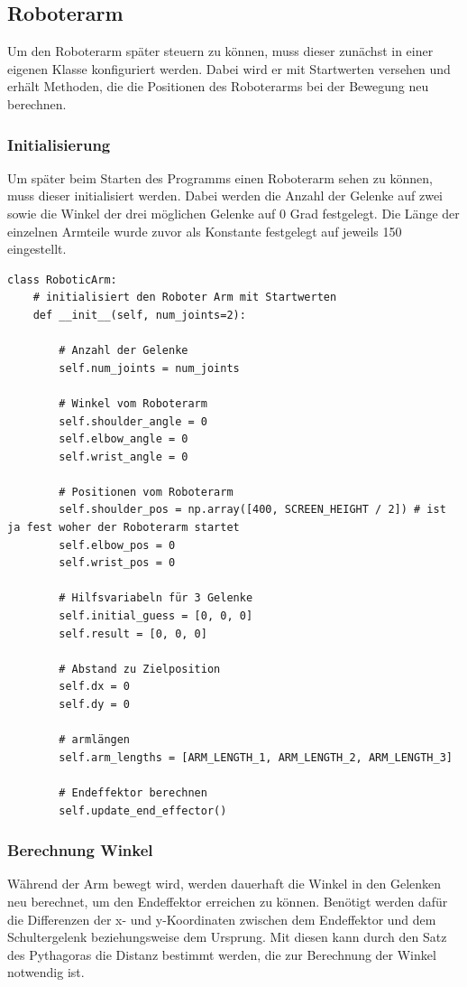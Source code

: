 \documentclass[12pt]{article}
\begin{document}
    \subsection{Roboterarm}
    Um den Roboterarm später steuern zu können, muss dieser zunächst in einer eigenen Klasse konfiguriert
    werden. Dabei wird er mit Startwerten versehen und erhält Methoden, die die Positionen des Roboterarms
    bei der Bewegung neu berechnen.

    \subsubsection{Initialisierung}
    Um später beim Starten des Programms einen Roboterarm sehen zu können, muss dieser initialisiert
    werden. Dabei werden die Anzahl der Gelenke auf zwei sowie die Winkel der drei möglichen Gelenke
    auf 0 Grad festgelegt. Die Länge der einzelnen Armteile wurde zuvor als Konstante festgelegt auf
    jeweils 150 eingestellt.


    \begin{lstlisting}
class RoboticArm:
    # initialisiert den Roboter Arm mit Startwerten
    def __init__(self, num_joints=2):

        # Anzahl der Gelenke
        self.num_joints = num_joints

        # Winkel vom Roboterarm
        self.shoulder_angle = 0
        self.elbow_angle = 0
        self.wrist_angle = 0

        # Positionen vom Roboterarm
        self.shoulder_pos = np.array([400, SCREEN_HEIGHT / 2]) # ist ja fest woher der Roboterarm startet
        self.elbow_pos = 0
        self.wrist_pos = 0

        # Hilfsvariabeln für 3 Gelenke
        self.initial_guess = [0, 0, 0]
        self.result = [0, 0, 0]

        # Abstand zu Zielposition
        self.dx = 0
        self.dy = 0

        # armlängen
        self.arm_lengths = [ARM_LENGTH_1, ARM_LENGTH_2, ARM_LENGTH_3]

        # Endeffektor berechnen
        self.update_end_effector()
    \end{lstlisting}

    \subsubsection{Berechnung Winkel}
    Während der Arm bewegt wird, werden dauerhaft die Winkel in den Gelenken neu berechnet, um den
    Endeffektor erreichen zu können. Benötigt werden dafür die Differenzen der x- und y-Koordinaten
    zwischen dem Endeffektor und dem Schultergelenk beziehungsweise dem Ursprung. Mit diesen kann durch
    den Satz des Pythagoras die Distanz bestimmt werden, die zur Berechnung der Winkel notwendig ist.
\end{document}
